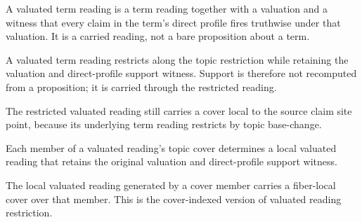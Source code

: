 \begin{proposition}\label{thm:claim-valuated-term-reading}\leanok{}
A valuated term reading is a term reading together with a valuation and a
witness that every claim in the term's direct profile fires truthwise under that
valuation.  It is a carried reading, not a bare proposition about a term.
\end{proposition}

\begin{theorem}\label{thm:claim-valuated-reading-restrict-support}\leanok{}
A valuated term reading restricts along the topic restriction while retaining
the valuation and direct-profile support witness.  Support is therefore not
recomputed from a proposition; it is carried through the restricted reading.
\end{theorem}

\begin{theorem}\label{thm:claim-valuated-reading-restrict-cover}\leanok{}
The restricted valuated reading still carries a cover local to the source claim
site point, because its underlying term reading restricts by topic base-change.
\end{theorem}

\begin{theorem}\label{thm:claim-valuated-reading-cover-restriction-support}\leanok{}
Each member of a valuated reading's topic cover determines a local valuated
reading that retains the original valuation and direct-profile support witness.
\end{theorem}

\begin{theorem}\label{thm:claim-valuated-reading-cover-restriction-cover}\leanok{}
The local valuated reading generated by a cover member carries a fiber-local
cover over that member.  This is the cover-indexed version of valuated reading
restriction.
\end{theorem}

